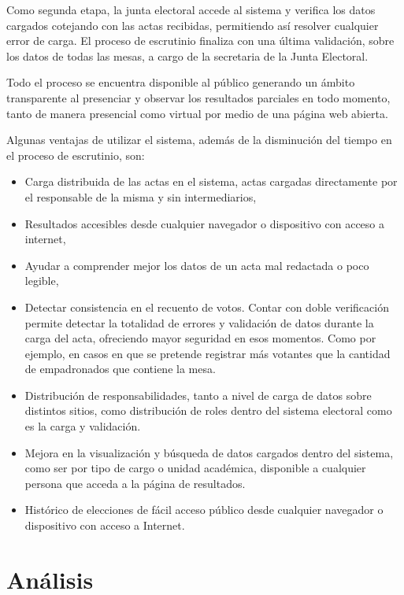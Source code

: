 Como segunda etapa, la junta electoral accede al sistema y verifica los datos cargados cotejando con las actas recibidas, permitiendo así resolver cualquier error de carga. 
El proceso de escrutinio finaliza con una última validación, sobre los datos de todas las mesas, a cargo de la secretaria de la Junta Electoral. 

Todo el proceso se encuentra disponible al público generando un ámbito transparente al presenciar y observar los resultados parciales en todo momento, tanto de manera presencial como virtual por medio de una página web abierta.

Algunas ventajas de utilizar el sistema, además de la disminución del tiempo en el proceso de escrutinio, son:
\begin{itemize}
\item Carga distribuida de las actas en el sistema, actas cargadas directamente por el responsable de la misma y sin intermediarios,
\item Resultados accesibles desde cualquier navegador o dispositivo con acceso a internet,
\item Ayudar a comprender mejor los datos de un acta mal redactada o poco legible,
\item Detectar consistencia en el recuento de votos. Contar con doble verificación permite detectar la totalidad de errores y validación de datos durante la carga del acta, ofreciendo mayor seguridad en esos momentos. Como por ejemplo, en casos en que se pretende registrar más votantes que la cantidad de empadronados que contiene la mesa.
\item Distribución de responsabilidades, tanto a nivel de carga de datos sobre distintos sitios, como distribución de roles dentro del sistema electoral como es la carga y validación.
\item Mejora en la visualización y búsqueda de datos cargados dentro del sistema, como ser por tipo de cargo o unidad académica, disponible a cualquier persona que acceda a la página de resultados.
\item Histórico de elecciones de fácil acceso público desde cualquier navegador o dispositivo con acceso a Internet.

\end{itemize}

\section{Análisis}
